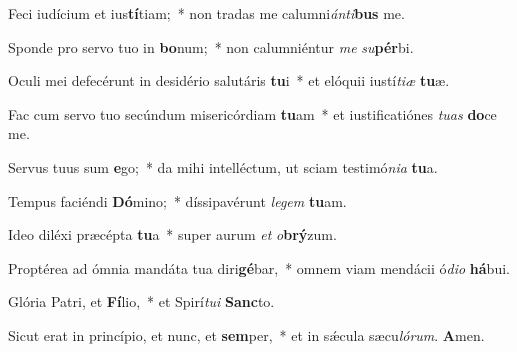 \item Feci iudícium et ius\textbf{tí}tiam;~* non tradas me calumni\textit{ánti}\textbf{bus} me.

\item Sponde pro servo tuo in \textbf{bo}num;~* non calumniéntur \textit{me} \textit{su}\textbf{pér}bi.

\item Oculi mei defecérunt in desidério salutáris \textbf{tu}i~* et elóquii iustí\textit{tiæ} \textbf{tu}æ.

\item Fac cum servo tuo secúndum misericórdiam \textbf{tu}am~* et iustificatiónes \textit{tuas} \textbf{do}ce me.

\item Servus tuus sum \textbf{e}go;~* da mihi intelléctum, ut sciam testimó\textit{nia} \textbf{tu}a.

\item Tempus faciéndi \textbf{Dó}mino;~* díssipavérunt \textit{legem} \textbf{tu}am.

\item Ideo diléxi præcépta \textbf{tu}a~* super aurum \textit{et} \textit{o}\textbf{brý}zum.

\item Proptérea ad ómnia mandáta tua diri\textbf{gé}bar,~* omnem viam mendácii ó\textit{dio} \textbf{há}bui.

\item Glória Patri, et \textbf{Fí}lio,~* et Spirí\textit{tui} \textbf{Sanc}to.

\item Sicut erat in princípio, et nunc, et \textbf{sem}per,~* et in sǽcula sæcu\textit{lórum}. \textbf{A}men.
